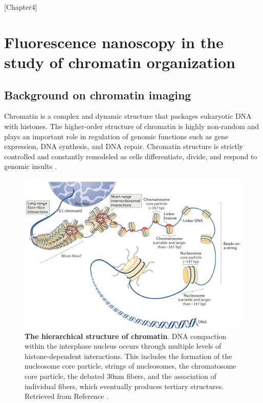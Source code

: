 [Chapter4]

\chapter{Fluorescence nanoscopy in the study of chromatin organization}

\section{Background on chromatin imaging}

Chromatin is a complex and dynamic structure that packages eukaryotic DNA with histones. The higher-order structure of chromatin is highly non-random and plays an important role in regulation of genomic functions such as gene expression, DNA synthesis, and DNA repair. Chromatin structure is strictly controlled and constantly remodeled as cells differentiate, divide, and respond to genomic insults \parencite{Auerbach2009,Chien2009,Clapier2009,Misteli2007,Vidi2014}.

\begin{figure}[t]
\centering
\includegraphics[width=13cm]{media/Chromatin.png}
\caption{\textbf{The hierarchical structure of chromatin}. DNA compaction within the interphase nucleus occurs through multiple levels of histone-dependent interactions. This includes the formation of the nucleosome core particle, strings of nucleosomes, the chromatosome core particle, the debated 30nm fibers, and the association of individual fibers, which eventually produces tertiary structures. Retrieved from Reference \parencite{Fyodorov2018}.}
\label{fig:fig16}
\end{figure}


